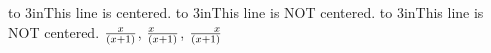 \def\cline #1{\hbox to 3in{\vrule\hfil #1\hfil\vrule}}
\cline{This line is centered.}
\cline{This line is NOT centered.\hfilneg}
\cline{\hfilneg This line is NOT centered.}
\baselineskip
$ x\over(x+1)$, $ \hfilneg x\over(x+1)$, $ x\hfilneg\over(x+1)$
\bye
